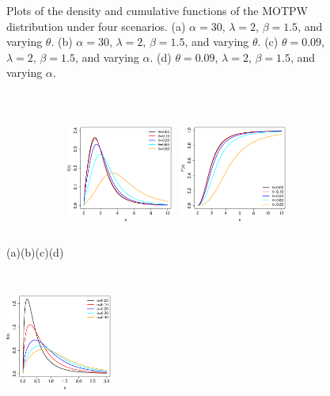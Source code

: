 \documentclass[12pt]{article}
\begin{document}
\begin{figure}[!htb]
\begin{center}
		\caption{Plots of the density and cumulative functions of the MOTPW distribution under four scenarios. (a) $\alpha=30$, $\lambda=2$, $\beta=1.5$, and varying $\theta$. (b)  $\alpha=30$, $\lambda=2$, $\beta=1.5$, and varying $\theta$. (c) $\theta=0.09$, $\lambda=2$, $\beta=1.5$, and varying $\alpha$. (d) $\theta=0.09$, $\lambda=2$, $\beta=1.5$,
			and varying  $\alpha$.}
		\label{fdp_e_fda_MOTPW}
	\end{center}
\end{figure}


\begin{figure}[!htb]\small
	\begin{center}
		(a)\hspace{3cm}(b)\hspace{3cm}(c)\hspace{3cm}(d)
		\includegraphics[width=3.5cm,height=5.5cm]{fdp_MOGBXII_variando_theta.eps}~
		\includegraphics[width=3.5cm,height=5.5cm]{fda_MOGBXII_variando_theta.eps}~
		\includegraphics[width=3.5cm,height=5.5cm]{fdp_MOGBXII_variando_alpha.eps}

\end{center}
\end{figure}
\end{document}
